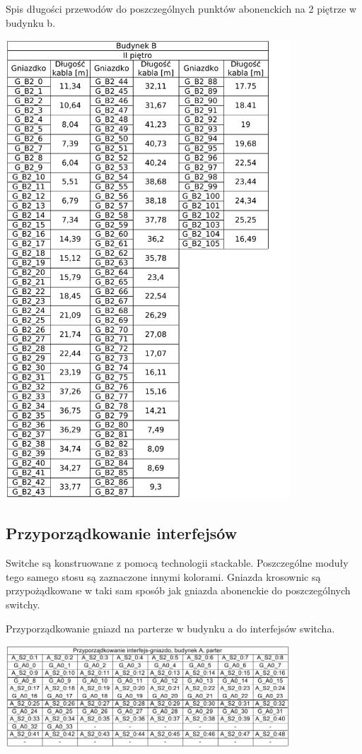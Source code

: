 \documentclass{report}
\begin{document}
\begin{table}[H]
\caption{Spis długości przewodów do poszczególnych punktów abonenckich na 2 piętrze w budynku b.}
 \centering
      \includegraphics[width=0.8\textwidth]{./obrazki/dl_kable/b2.png}
\end{table}

\subsection{Przyporządkowanie interfejsów}

Switche są konstruowane z pomocą technologii stackable. Poszczególne moduły tego samego stosu są zaznaczone innymi kolorami.
Gniazda krosownic są przypożądkowane w taki sam sposób jak gniazda abonenckie do poszczególnych switchy.

\begin{table}[H]
\caption{Przyporządkowanie gniazd na parterze w budynku a do interfejsów switcha.}
 \centering
      \includegraphics[width=0.8\textwidth]{./obrazki/tab_kros/a0.png}
\end{table}
\end{document}
